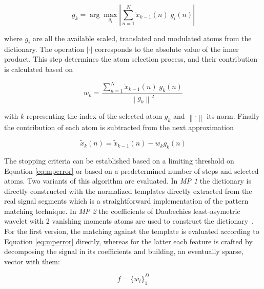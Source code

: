 \documentclass[brainsci,article,submit,moreauthors,pdftex,10pt,a4paper]{mdpi}
\begin{document}
\begin{equation}
g_{k} = \arg \max_{g_{i}} \left\lvert  \sum_{n=1}^{N} \tilde{x}_{k-1}(n) \; g_{i}(n) \right\rvert 
\label{eq:mp3}
\end{equation}

\noindent where $g_{i}$ are all the available scaled, translated and modulated atoms from the dictionary.  The operation $\left\lvert \cdot \right\rvert$ corresponds to the absolute value of the inner product.  This step determines the atom selection process, and their contribution is calculated based on 



\begin{equation}
w_{k} =  \frac{\sum_{n=1}^{N} \tilde{x}_{k-1}(n) \; g_{k}(n)}{  {\left\lVert  g_{k} \right\rVert}^{2} }
\label{eq:mp4}
\end{equation}

\noindent with $k$ representing the index of the selected atom $g_{k}$ and $\left\lVert \cdot \right\rVert$ its norm.  Finally the contribution of each atom is subtracted from the next approximation~\citep{Cohen2014,Sanei2007, Mallat1993}

\begin{equation}
\tilde{x}_{k}(n)=  \tilde{x}_{k-1}(n) - w_{k} g_{k} (n)
\label{eq:mp5}
\end{equation}

The stopping criteria can be established based on a limiting threshold on Equation \ref{eq:mperror} or based on a predetermined number of steps and selected atoms.  Two variants of this algorithm are evaluated. In \textit{MP 1} the dictionary is directly constructed with the normalized templates directly extracted from the real signal segments which is a straightforward implementation of the pattern matching technique.  In \textit{MP 2} the coefficients of Daubechies least-asymetric wavelet with 2 vanishing moments atoms are used to construct the dictionary~\citep{Vareka2012}.  For the first version, the matching against the template is evaluated according to Equation \ref{eq:mperror} directly, whereas for the latter each feature is crafted by decomposing the signal in its coefficients and building, an eventually sparse, vector with them:

\begin{equation}
f =  {\bigg \{ w_{i} \bigg \}}_{1}^{D} 
\label{eq:mp6}
\end{equation}
\end{document}

